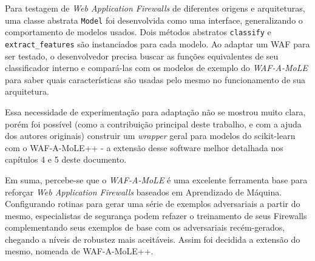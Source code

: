 Para testagem de \textit{Web Application Firewalls} de diferentes origens e arquiteturas, uma classe abstrata \verb+Model+ foi desenvolvida como uma interface, generalizando o comportamento de modelos usados. Dois métodos abstratos \verb+classify+ e \verb+extract_features+ são instanciados para cada modelo. Ao adaptar um WAF para ser testado, o desenvolvedor precisa buscar as funções equivalentes de seu classificador interno e compará-las com os modelos de exemplo do \textit{WAF-A-MoLE} para saber quais características são usadas pelo mesmo no funcionamento de sua arquitetura.

Essa necessidade de experimentação para adaptação não se mostrou muito clara, porém foi possível (como a contribuição principal deste trabalho, e com a ajuda dos autores originais) construir um \textit{wrapper} geral para modelos do scikit-learn com o WAF-A-MoLE++ - a extensão desse software melhor detalhada nos capítulos 4 e 5 deste documento.

Em suma, percebe-se que o \textit{WAF-A-MoLE} é uma excelente ferramenta base para reforçar \textit{Web Application Firewalls} baseados em Aprendizado de Máquina. Configurando rotinas para gerar uma série de exemplos adversariais a partir do mesmo, especialistas de segurança podem refazer o treinamento de seus Firewalls complementando seus exemplos de base com os adversariais recém-gerados, chegando a níveis de robustez mais aceitáveis. Assim foi decidida a extensão do mesmo, nomeada de WAF-A-MoLE++.




